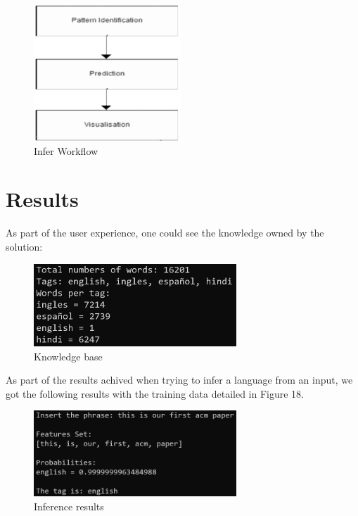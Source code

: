 \documentclass[sigconf,12pt,review=false,natbib=false]{acmart}
\begin{document}
\begin{figure}[h!]
    \centering
    \includegraphics[height=2in]{workflow}
    \caption{Infer Workflow}
    \label{fig:workflow}
\end{figure}

\section{Results}

As part of the user experience, one could see the knowledge owned by the solution: \\

\begin{figure}[h!]
    \centering
    \includegraphics[width=3in]{knowledge}
    \caption{Knowledge base}
    \label{fig:knowledge}
\end{figure}

As part of the results achived when trying to infer a language from an input, we got the following results with the
training data detailed in Figure 18. \\

\begin{figure}[h!]
    \centering
    \includegraphics[width=3in]{inference}
    \caption{Inference results}
    \label{fig:inference}
\end{figure}
\end{document}
